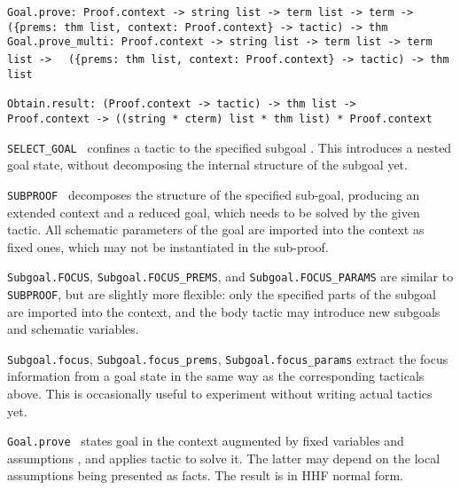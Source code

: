 \begin{isabellebody}
\begin{isamarkuptext}
  \begin{mldecls}
  \verb|Goal.prove: Proof.context -> string list -> term list -> term ->|\isasep\isanewline%
\verb|  ({prems: thm list, context: Proof.context} -> tactic) -> thm| \\
  \verb|Goal.prove_multi: Proof.context -> string list -> term list -> term list ->|\isasep\isanewline%
\verb|  ({prems: thm list, context: Proof.context} -> tactic) -> thm list| \\
  \end{mldecls}
  \begin{mldecls}
  \verb|Obtain.result: (Proof.context -> tactic) -> thm list ->|\isasep\isanewline%
\verb|  Proof.context -> ((string * cterm) list * thm list) * Proof.context| \\
  \end{mldecls}

  \begin{description}

  \item \verb|SELECT_GOAL|~ confines a tactic to the
  specified subgoal .  This introduces a nested goal state,
  without decomposing the internal structure of the subgoal yet.

  \item \verb|SUBPROOF|~ decomposes the structure
  of the specified sub-goal, producing an extended context and a
  reduced goal, which needs to be solved by the given tactic.  All
  schematic parameters of the goal are imported into the context as
  fixed ones, which may not be instantiated in the sub-proof.

  \item \verb|Subgoal.FOCUS|, \verb|Subgoal.FOCUS_PREMS|, and \verb|Subgoal.FOCUS_PARAMS| are similar to \verb|SUBPROOF|, but are
  slightly more flexible: only the specified parts of the subgoal are
  imported into the context, and the body tactic may introduce new
  subgoals and schematic variables.

  \item \verb|Subgoal.focus|, \verb|Subgoal.focus_prems|, \verb|Subgoal.focus_params| extract the focus information from a goal
  state in the same way as the corresponding tacticals above.  This is
  occasionally useful to experiment without writing actual tactics
  yet.

  \item \verb|Goal.prove|~ states goal  in the context augmented by fixed variables  and
  assumptions , and applies tactic  to solve
  it.  The latter may depend on the local assumptions being presented
  as facts.  The result is in HHF normal form.


\end{description}
\end{isamarkuptext}
\end{isabellebody}

